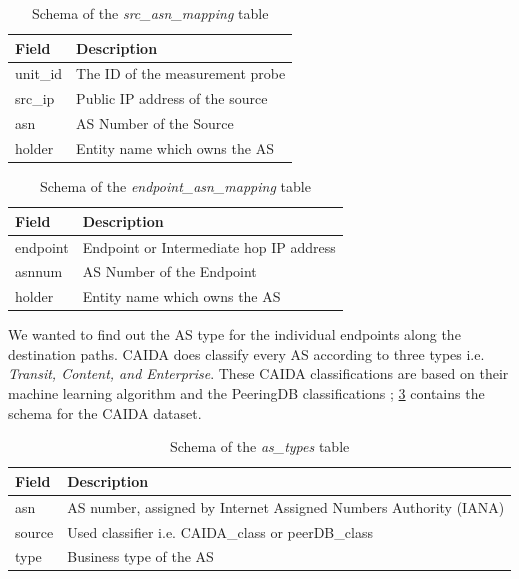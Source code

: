 \begin{table}[!h]
	\centering
	\caption{Schema of the \textit{src\_asn\_mapping} table}
	\label{table:sourcemlab}
	\begin{tabular}{lp{7cm}}
  		\toprule
  		\textbf{Field} & \textbf{Description} \\ 
  		\midrule
  		unit\_id & The ID of the measurement probe \\
  		src\_ip & Public IP address of the source \\
  		asn & AS Number of the Source \\
  		holder & Entity name which owns the AS \\
  		\bottomrule
\end{tabular}
\end{table}

\begin{table}[!h]
	\centering
	\caption{Schema of the \textit{endpoint\_asn\_mapping} table}
	\label{table:endpointmlab}
	\begin{tabular}{lp{7cm}}
  		\toprule
  		\textbf{Field} & \textbf{Description} \\ 
  		\midrule
  		endpoint & Endpoint or Intermediate hop IP address \\
  		asnnum & AS Number of the Endpoint \\
  		holder & Entity name which owns the AS \\
  		\bottomrule
\end{tabular}
\end{table}

\FloatBarrier

We wanted to find out the AS type for the individual endpoints along the destination paths. CAIDA \cite{caida} does classify every AS according to three types i.e. \textit{Transit, Content, and Enterprise}. These CAIDA classifications are based on their machine learning algorithm and the PeeringDB classifications \cite{peeringdb}; \cref{table:caidamlab} contains the schema for the CAIDA dataset.

\begin{table}[!h]
	\centering
	\caption{Schema of the \textit{as\_types} table}
	\label{table:caidamlab}
	\begin{tabular}{lp{7cm}}
  		\toprule
  		\textbf{Field} & \textbf{Description} \\ 
  		\midrule
  		asn & AS number, assigned by Internet Assigned Numbers Authority (IANA)\\
  		source & Used classifier i.e. CAIDA\_class or peerDB\_class \\
  		type & Business type of the AS \\
  		\bottomrule
\end{tabular}
\end{table}

